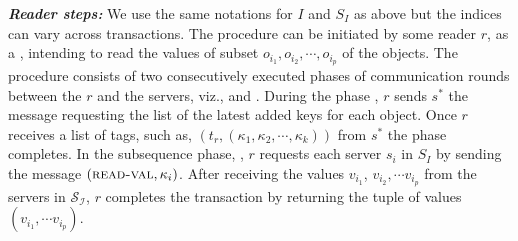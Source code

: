 
\textit{\textbf{Reader steps:}}
We use the same notations for $I$ and $S_I$ as above but the indices can vary across  transactions.
The procedure   can be 
initiated by  some reader  $r$,   as a \rot{}, intending to read the values of 
subset $o_{i_1},  o_{i_2}, \cdots, o_{i_p}$ of the objects. The procedure 
consists of two consecutively executed phases of communication rounds
between the $r$ and the  servers, viz.,  {\getTagArray} and {\readValue}. 
%
During  the  phase {\getTagArray},  $r$ sends $s^*$ the message  {\getTagArrayTag}  
 requesting the  list of the latest added keys for each object. 
 Once $r$ receives a list of tags, such as, $(t_r, ({\kappa}_1, {\kappa}_2, \cdots,  {\kappa}_k))$ from $s^*$   the phase completes.
%
%
In the subsequence phase, {\readValue},   $r$ requests each server $s_i$ in $S_I$ by sending the message 
$(\text{{\sc read-val}}, \kappa_i)$. 
%
After  receiving the values $v_{i_1}$, $v_{i_2}, \cdots v_{i_p}$ from the servers in $\mathcal{S_I}$, 
 $r$ completes the transaction  by 
 returning the tuple of values $(v_{i_1}, \cdots v_{i_p})$.

